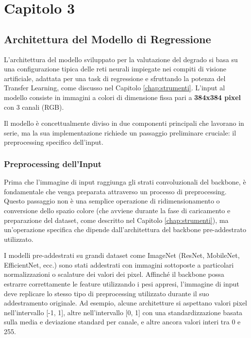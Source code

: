 %
%
\chapter{Capitolo 3}
\label{chap:soluzione}

\section{Architettura del Modello di Regressione}

L'architettura del modello sviluppato per la valutazione del degrado si basa su una configurazione tipica delle reti neurali impiegate nei compiti di visione artificiale, adattata per una task di regressione e sfruttando la potenza del Transfer Learning, come discusso nel Capitolo \ref{chap:strumenti}. L'input al modello consiste in immagini a colori di dimensione fissa pari a \textbf{384x384 pixel} con 3 canali (RGB).

Il modello è concettualmente diviso in due componenti principali che lavorano in serie, ma la sua implementazione richiede un passaggio preliminare cruciale: il preprocessing specifico dell'input.

\subsection{Preprocessing dell'Input}

Prima che l'immagine di input raggiunga gli strati convoluzionali del backbone, è fondamentale che venga preparata attraverso un processo di preprocessing. Questo passaggio non è una semplice operazione di ridimensionamento o conversione dello spazio colore (che avviene durante la fase di caricamento e preparazione del dataset, come descritto nel Capitolo \ref{chap:strumenti}), ma un'operazione specifica che dipende dall'architettura del backbone pre-addestrato utilizzato.

I modelli pre-addestrati su grandi dataset come ImageNet (ResNet, MobileNet, EfficientNet, ecc.) sono stati addestrati con immagini sottoposte a particolari normalizzazioni o scalature dei valori dei pixel. Affinché il backbone possa estrarre correttamente le feature utilizzando i pesi appresi, l'immagine di input deve replicare lo stesso tipo di preprocessing utilizzato durante il suo addestramento originale. Ad esempio, alcune architetture si aspettano valori pixel nell'intervallo [-1, 1], altre nell'intervallo [0, 1] con una standardizzazione basata sulla media e deviazione standard per canale, e altre ancora valori interi tra 0 e 255.

